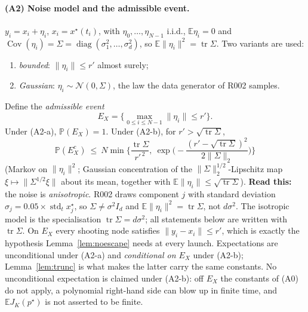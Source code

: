 \documentclass[11pt]{article}
\theoremstyle{remark}\newtheorem{remark}{Remark}
\newcommand{\pstar}{p^\star}
\newcommand{\norm}[1]{\lVert #1\rVert}
\newcommand{\readthis}[1]{\textbf{Read this:} #1}
\begin{document}
\paragraph{(A2) Noise model and the admissible event.}
$y_i=x_i+\eta_i$, $x_i=x^\star(t_i)$, with $\eta_0,\dots,\eta_{N-1}$ i.i.d., $\mathbb E\eta_i=0$ and $\operatorname{Cov}(\eta_i)=\Sigma=\operatorname{diag}(\sigma_1^2,\dots,\sigma_d^2)$, so $\mathbb E\norm{\eta_i}^2=\operatorname{tr}\Sigma$. Two variants are used:
\begin{enumerate}[nosep,label=(A2-\alph*)]
\item \emph{bounded}: $\norm{\eta_i}\le r'$ almost surely;
\item \emph{Gaussian}: $\eta_i\sim\mathcal N(0,\Sigma)$, the law the data generator of R002 samples.
\end{enumerate}
Define the \emph{admissible event}
\begin{equation}
E_X=\Big\{\max_{0\le i\le N-1}\norm{\eta_i}\le r'\Big\}.
\label{eq:EX}
\end{equation}
Under (A2-a), $\mathbb P(E_X)=1$. Under (A2-b), for $r'>\sqrt{\operatorname{tr}\Sigma}$,
\begin{equation}
\mathbb P(E_X^{c})\ \le\ N\min\Big\{\frac{\operatorname{tr}\Sigma}{r'^{\,2}},\
\exp\Big(-\frac{(r'-\sqrt{\operatorname{tr}\Sigma})^{2}}{2\norm{\Sigma}_2}\Big)\Big\}
\label{eq:tail}
\end{equation}
(Markov on $\norm{\eta_i}^2$; Gaussian concentration of the $\norm{\Sigma}_2^{1/2}$-Lipschitz map $\xi\mapsto\norm{\Sigma^{1/2}\xi}$ about its mean, together with $\mathbb E\norm{\eta_i}\le\sqrt{\operatorname{tr}\Sigma}$).
\readthis{the noise is \emph{anisotropic}. R002 draws component $j$ with standard deviation $\sigma_j=0.05\times\operatorname{std}_t x^\star_j$, so $\Sigma\neq\sigma^2 I_d$ and $\mathbb E\norm{\eta_i}^2=\operatorname{tr}\Sigma$, not $d\sigma^2$. The isotropic model is the specialisation $\operatorname{tr}\Sigma=d\sigma^2$; all statements below are written with $\operatorname{tr}\Sigma$. On $E_X$ every shooting node satisfies $\norm{y_i-x_i}\le r'$, which is exactly the hypothesis Lemma~\ref{lem:noescape} needs at every launch. Expectations are unconditional under (A2-a) and \emph{conditional on $E_X$} under (A2-b); Lemma~\ref{lem:trunc} is what makes the latter carry the same constants. No unconditional expectation is claimed under (A2-b): off $E_X$ the constants of (A0) do not apply, a polynomial right-hand side can blow up in finite time, and $\mathbb E J_K(\pstar)$ is not asserted to be finite.}
\end{document}

